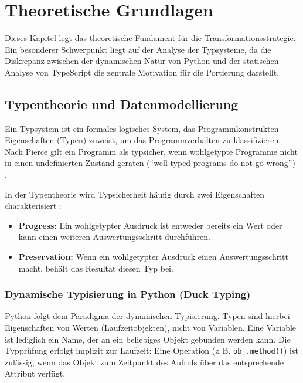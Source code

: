 
\section{Theoretische Grundlagen}
\label{sec:grundlagen}

Dieses Kapitel legt das theoretische Fundament für die Transformationsstrategie. Ein besonderer Schwerpunkt liegt auf der Analyse der Typsysteme, da die Diskrepanz zwischen der dynamischen Natur von Python und der statischen Analyse von TypeScript die zentrale Motivation für die Portierung darstellt.

\subsection{Typentheorie und Datenmodellierung}
\label{subsec:type_theory}

Ein Typsystem ist ein formales logisches System, das Programmkonstrukten Eigenschaften (Typen) zuweist, um das Programmverhalten zu klassifizieren. Nach Pierce gilt ein Programm als typsicher, wenn wohlgetypte Programme nicht in einen undefinierten Zustand geraten (\enquote{well-typed programs do not go wrong}) \autocite[S.1ff]{pierce2002tapl}.

In der Typentheorie wird Typsicherheit häufig durch zwei Eigenschaften charakterisiert \autocite[S.95ff]{pierce2002tapl}:
\begin{itemize}
	\item \textbf{Progress:} Ein wohlgetypter Ausdruck ist entweder bereits ein Wert oder kann einen weiteren Auswertungsschritt durchführen.
	\item \textbf{Preservation:} Wenn ein wohlgetypter Ausdruck einen Auswertungsschritt macht, behält das Resultat diesen Typ bei.
\end{itemize}

\subsubsection{Dynamische Typisierung in Python (Duck Typing)}
Python folgt dem Paradigma der dynamischen Typisierung. Typen sind hierbei Eigenschaften von Werten (Laufzeitobjekten), nicht von Variablen. Eine Variable ist lediglich ein Name, der an ein beliebiges Objekt gebunden werden kann. Die Typprüfung erfolgt implizit zur Laufzeit: Eine Operation (z.\,B. \texttt{obj.method()}) ist zulässig, wenn das Objekt zum Zeitpunkt des Aufrufs über das entsprechende Attribut verfügt.


